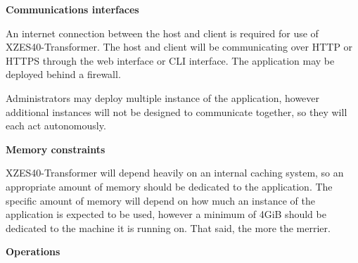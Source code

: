 

\textbf{Communications interfaces}

An internet connection between the host and client is required for use of XZES40-Transformer.
The host and client will be communicating over HTTP or HTTPS through the web interface or CLI interface.
The application may be deployed behind a firewall.

Administrators may deploy multiple instance of the application, however additional instances will not be designed to communicate together, so they will each act autonomously.


\textbf{Memory constraints}

XZES40-Transformer will depend heavily on an internal caching system, so an appropriate amount of memory should be dedicated to the application.
The specific amount of memory will depend on how much an instance of the application is expected to be used, however
a minimum of 4GiB should be dedicated to the machine it is running on.
That said, the more the merrier.

\textbf{Operations}

